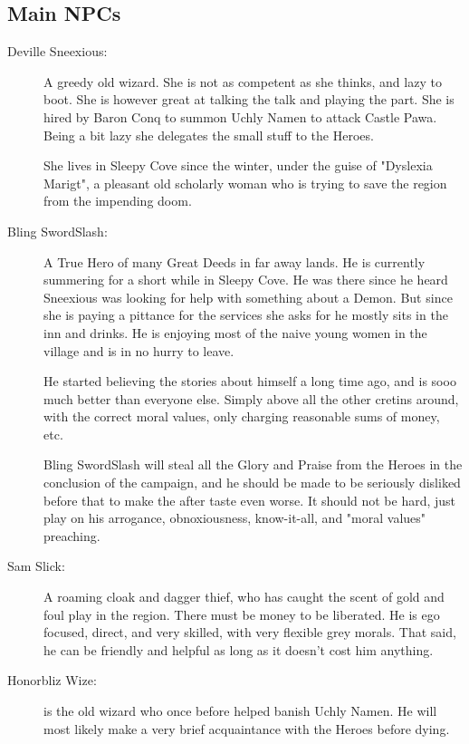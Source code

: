 \documentclass[11pt, twoside, titlepage, a4paper]{report}
\begin{document}
\subsection*{Main NPCs}

\begin{description}

\item[Deville Sneexious:] A greedy old wizard. She is not as competent as she thinks, and lazy to boot. She is however great at talking the talk and playing the part. She is hired by Baron Conq to summon Uchly Namen to attack Castle Pawa. Being a bit lazy she delegates the small stuff to the Heroes.

She lives in Sleepy Cove since the winter, under the guise of "Dyslexia Marigt", a pleasant old scholarly woman who is trying to save the region from the impending doom.


\item[Bling SwordSlash:] A True Hero of many Great Deeds in far away lands. He is currently summering for a short while in Sleepy Cove. He was there since he heard Sneexious was looking for help with something about a Demon. But since she is paying a pittance for the services she asks for he mostly sits in the inn and drinks. He is enjoying most of the naive young women in the village and is in no hurry to leave.

He started believing the stories about himself a long time ago, and is sooo much better than everyone else. Simply above all the other cretins around, with the correct moral values, only charging reasonable sums of money, etc.

Bling SwordSlash will steal all the Glory and Praise from the Heroes in the conclusion of the campaign, and he should be made to be seriously disliked before that to make the after taste even worse. It should not be hard, just play on his arrogance, obnoxiousness, know-it-all, and "moral values" preaching.


\item[Sam Slick:] A roaming cloak and dagger thief, who has caught the scent of gold and foul play in the region. There must be money to be liberated. He is ego focused, direct, and very skilled, with very flexible grey morals. That said, he can be friendly and helpful as long as it doesn't cost him anything.


\item[Honorbliz Wize:] is the old wizard who once before helped banish Uchly Namen. He will most likely make a very brief acquaintance with the Heroes before dying.



\end{description}
\end{document}
